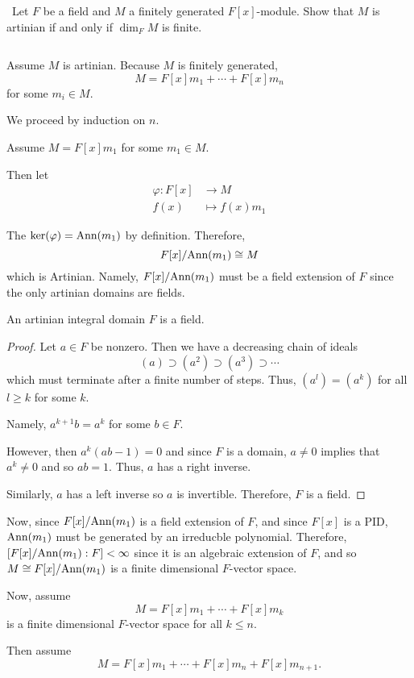 \documentclass[12pt]{Qual}
\begin{document}
\begin{problem} $\,$
Let $F$ be a field and $M$ a finitely generated $F[x]$-module. Show that $M$ is artinian if and only if $\dim_FM$ is finite.
\end{problem}


\begin{solution}$\,$

\boxed{\implies} Assume $M$ is artinian. Because $M$ is finitely generated, $$M=F[x]m_1+\cdots+F[x]m_n$$ for some $m_i\in M.$

We proceed by induction on $n.$

Assume $M=F[x]m_1$ for some $m_1\in M$.

Then let \begin{align*}
    \varphi:F[x]&\to M\\
    f(x)&\mapsto f(x)m_1
\end{align*}

The $\ker(\varphi)=\text{Ann}(m_1)$ by definition. Therefore, $$F[x]/\text{Ann}(m_1)\cong M$$ which is Artinian. Namely, $F[x]/\text{Ann}(m_1)$ must be a field extension of $F$ since the only artinian domains are fields.

\begin{claim} An artinian integral domain $F$ is a field.
\begin{proof} Let $a\in F$ be nonzero. Then we have a decreasing chain of ideals $$(a)\supset (a^2)\supset (a^3)\supset\cdots$$ which must terminate after a finite number of steps. Thus, $(a^l)=(a^k)$ for all $l\ge k$ for some $k.$

Namely, $a^{k+1}b=a^k$ for some $b\in F$.

However, then $a^k(ab-1)=0$ and since $F$ is a domain, $a\not=0$ implies that $a^k\not=0$ and so $ab=1$. Thus, $a$ has a right inverse.

Similarly, $a$ has a left inverse so $a$ is invertible. Therefore, $F$ is a field.
\end{proof}
\end{claim}

Now, since $F[x]/\text{Ann}(m_1)$ is a field extension of $F$, and since $F[x]$ is a PID, $\text{Ann}(m_1)$ must be generated by an irreducble polynomial. Therefore, $[F[x]/\text{Ann}(m_1):F]<\infty$ since it is an algebraic extension of $F$, and so $M\cong F[x]/\text{Ann}(m_1)$ is a finite dimensional $F$-vector space.

Now, assume $$M=F[x]m_1+\cdots+F[x]m_k$$ is a finite dimensional $F$-vector space for all $k\le n$.

Then assume $$M=F[x]m_1+\cdots+F[x]m_n+F[x]m_{n+1}.$$


\end{solution}
\end{document}
